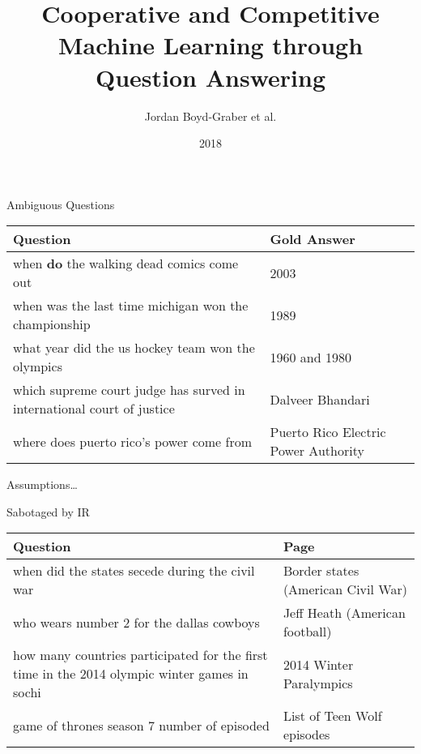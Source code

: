 \documentclass[xcolor=table]{beamer}
\title[HCQA]{Cooperative and Competitive Machine Learning through Question Answering}
\author{ Jordan Boyd-Graber et al.}
\date{2018}
\institute[Maryland] %
{University of Maryland}
\begin{document}



\begin{frame}{Ambiguous Questions}
  \begin{small}
  \begin{tabular}{p{7cm}p{3cm}}
    \toprule
    Question & Gold Answer \\
    \hline
    \alert<1>{when {\bf do} the walking dead comics come out} & 2003 \\
    \alert<2>{when was the last time michigan won the championship} & 1989 \\
    \alert<3>{what year did the us hockey team won the olympics} & 1960 and 1980 \\
    \alert<4>{which supreme court judge has surved in international court of justice} & Dalveer Bhandari \\
    \alert<5>{where does puerto rico's power come from} & Puerto Rico Electric Power Authority \\
    \bottomrule
  \end{tabular}
  \end{small}
  \begin{block}{Assumptions\dots}
  \end{block}
\end{frame}

\begin{frame}{Sabotaged by IR}

  \begin{small}
  \begin{tabular}{p{7cm}p{3cm}}
    \toprule
    Question & Page \\
    \hline
 when did the states secede during the civil war &  Border states (American Civil War) \\
 who wears number 2 for the dallas cowboys &  Jeff Heath (American football) \\
 how many countries participated for the first time in the 2014 olympic winter games in sochi & 2014 Winter Paralympics \\
 game of thrones season 7 number of episoded &  List of Teen Wolf episodes \\
 \bottomrule
  \end{tabular}
  \end{small}

\end{frame}
\end{document}
